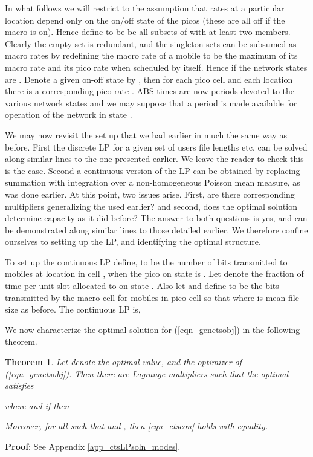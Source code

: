 \documentclass[12pt, draftcls, onecolumn]{IEEEtranTCOM}
\newtheorem{theorem}{Theorem}
\begin{document}
{In what follows we will restrict to the assumption that rates at a particular location depend only on the on/off state of
the picos (these are all off if the macro is on). Hence define  to be
be all subsets of  with at least two members. Clearly the empty set is redundant, and the singleton sets
can be subsumed as macro rates by redefining the macro rate of a mobile to be the maximum of its macro rate and its
pico rate when scheduled by itself. Hence if  the network states are .
Denote a given on-off state by , then for each pico cell  and each location there is a corresponding
pico rate . ABS times are now periods devoted to the various
network states and we may suppose that a period  is made available for operation of
the network in state . 


We may now revisit the set up that we had earlier in much the same way as before. First
the discrete LP for a given set of users file lengths etc. can be solved along similar
lines to the one presented earlier. We leave the reader to check this is the case.
Second a continuous version of the LP can be obtained by replacing summation with
integration over a non-homogeneous Poisson mean measure, as was done earlier. At this point,
two issues arise. First, are there corresponding multipliers generalizing the  used
earlier? and second, does the optimal solution determine capacity as it did before? The answer to both
questions is yes, and can be demonstrated along similar lines to those detailed earlier. We therefore confine ourselves to setting up the LP, and identifying the optimal structure.




To set up the continuous LP define,  to be the number of bits transmitted to mobiles
at location  in cell , when the pico on state is . Let  denote the fraction of
time per unit slot allocated to on state . Also let  and define  to be the bits transmitted by the macro cell for mobiles in pico cell  so that
 where  is mean file size as before. The continuous LP is,


We now characterize the optimal solution for (\ref{eqn_genctsobj}) in the following theorem.
\begin{theorem}
\label{thm_ctsLPsoln_modes}
Let  denote the optimal value, and  the optimizer of (\ref{eqn_genctsobj}). Then there
are Lagrange multipliers  such
that the optimal  satisfies

where 
and if  then

Moreover, for all  such that  and , then \eqref{eqn_ctscon} holds with equality.
\end{theorem}
{\bf Proof}: See Appendix \ref{app_ctsLPsoln_modes}.

}
\end{document}
